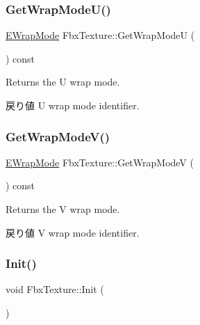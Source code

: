 \mbox{\label{class_fbx_texture_a4df1c01895bf8fb995a5c031de7b77fe}} 
\subsubsection{\texorpdfstring{Get\+Wrap\+Mode\+U()}{GetWrapModeU()}}
{\footnotesize\ttfamily \hyperlink{class_fbx_texture_ae273dffe3ff532dfd57e7bdb15b121fd}{E\+Wrap\+Mode} Fbx\+Texture\+::\+Get\+Wrap\+ModeU (\begin{DoxyParamCaption}{ }\end{DoxyParamCaption}) const}

Returns the U wrap mode. \begin{DoxyReturn}{戻り値}
U wrap mode identifier. 
\end{DoxyReturn}
\mbox{\label{class_fbx_texture_abf31cda728e2ff7f94e10dca19de19d2}} 
\subsubsection{\texorpdfstring{Get\+Wrap\+Mode\+V()}{GetWrapModeV()}}
{\footnotesize\ttfamily \hyperlink{class_fbx_texture_ae273dffe3ff532dfd57e7bdb15b121fd}{E\+Wrap\+Mode} Fbx\+Texture\+::\+Get\+Wrap\+ModeV (\begin{DoxyParamCaption}{ }\end{DoxyParamCaption}) const}

Returns the V wrap mode. \begin{DoxyReturn}{戻り値}
V wrap mode identifier. 
\end{DoxyReturn}
\mbox{\label{class_fbx_texture_a2e0e1f9bca241abf56d471168a93c5fc}} 
\subsubsection{\texorpdfstring{Init()}{Init()}}
{\footnotesize\ttfamily void Fbx\+Texture\+::\+Init (\begin{DoxyParamCaption}{ }\end{DoxyParamCaption})\hspace{0.3cm}{\ttfamily [protected]}}

